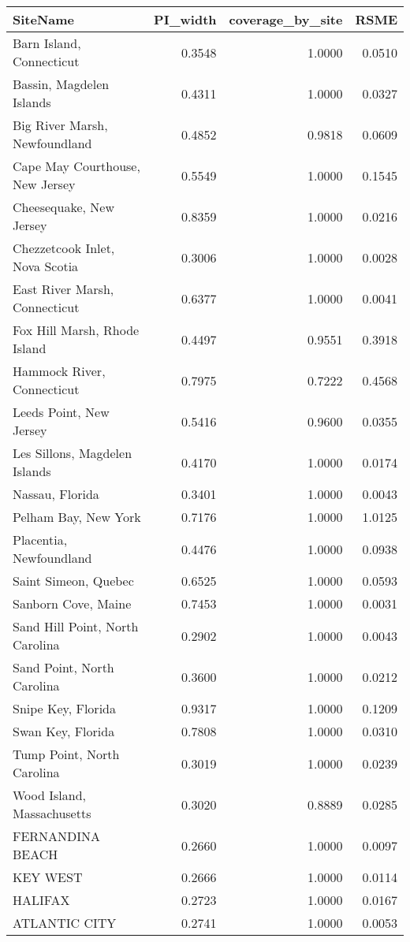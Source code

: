 \begin{table}[ht]
\centering
\begin{tabular}{lrrr}
  \hline
SiteName & PI\_width & coverage\_by\_site & RSME \\ 
  \hline
Barn Island,
 Connecticut & 0.3548 & 1.0000 & 0.0510 \\ 
  Bassin,
 Magdelen Islands & 0.4311 & 1.0000 & 0.0327 \\ 
  Big River Marsh,
 Newfoundland & 0.4852 & 0.9818 & 0.0609 \\ 
  Cape May Courthouse,
 New Jersey & 0.5549 & 1.0000 & 0.1545 \\ 
  Cheesequake,
 New Jersey & 0.8359 & 1.0000 & 0.0216 \\ 
  Chezzetcook Inlet,
 Nova Scotia & 0.3006 & 1.0000 & 0.0028 \\ 
  East River Marsh,
 Connecticut & 0.6377 & 1.0000 & 0.0041 \\ 
  Fox Hill Marsh,
 Rhode Island & 0.4497 & 0.9551 & 0.3918 \\ 
  Hammock River,
 Connecticut & 0.7975 & 0.7222 & 0.4568 \\ 
  Leeds Point,
 New Jersey & 0.5416 & 0.9600 & 0.0355 \\ 
  Les Sillons,
 Magdelen Islands & 0.4170 & 1.0000 & 0.0174 \\ 
  Nassau,
 Florida & 0.3401 & 1.0000 & 0.0043 \\ 
  Pelham Bay,
 New York & 0.7176 & 1.0000 & 1.0125 \\ 
  Placentia,
 Newfoundland & 0.4476 & 1.0000 & 0.0938 \\ 
  Saint Simeon,
 Quebec & 0.6525 & 1.0000 & 0.0593 \\ 
  Sanborn Cove,
 Maine & 0.7453 & 1.0000 & 0.0031 \\ 
  Sand Hill Point,
 North Carolina & 0.2902 & 1.0000 & 0.0043 \\ 
  Sand Point,
 North Carolina & 0.3600 & 1.0000 & 0.0212 \\ 
  Snipe Key,
 Florida & 0.9317 & 1.0000 & 0.1209 \\ 
  Swan Key,
 Florida & 0.7808 & 1.0000 & 0.0310 \\ 
  Tump Point,
 North Carolina & 0.3019 & 1.0000 & 0.0239 \\ 
  Wood Island,
 Massachusetts & 0.3020 & 0.8889 & 0.0285 \\ 
  FERNANDINA BEACH & 0.2660 & 1.0000 & 0.0097 \\ 
  KEY WEST & 0.2666 & 1.0000 & 0.0114 \\ 
  HALIFAX & 0.2723 & 1.0000 & 0.0167 \\ 
  ATLANTIC CITY & 0.2741 & 1.0000 & 0.0053 \\ 
   \hline
\end{tabular}
\end{table}
